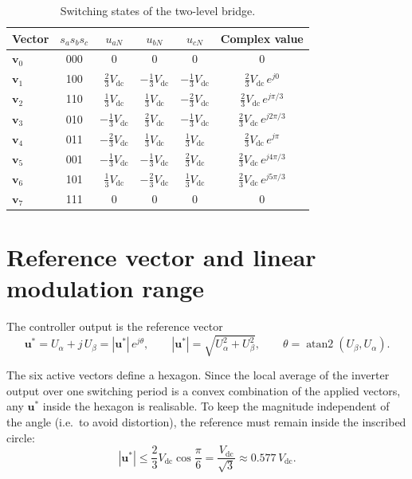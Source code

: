 \documentclass[11pt,a4paper]{article}
\newcommand{\vdc}{V_{\mathrm{dc}}}
\newcommand{\ualpha}{U_{\alpha}}
\newcommand{\ubeta}{U_{\beta}}
\newcommand{\vs}{\bm{u}^{*}}
\begin{document}
\begin{table}[h]
\centering
\begin{tabular}{lccccc}
\toprule
Vector & $s_a s_b s_c$ & $u_{aN}$ & $u_{bN}$ & $u_{cN}$ & Complex value \\
\midrule
$\bm{v}_0$ & 000 & $0$ & $0$ & $0$ & $0$ \\
$\bm{v}_1$ & 100 & $ \tfrac{2}{3}\vdc$ & $-\tfrac{1}{3}\vdc$ & $-\tfrac{1}{3}\vdc$ & $\tfrac{2}{3}\vdc\,e^{j0}$ \\
$\bm{v}_2$ & 110 & $ \tfrac{1}{3}\vdc$ & $ \tfrac{1}{3}\vdc$ & $-\tfrac{2}{3}\vdc$ & $\tfrac{2}{3}\vdc\,e^{j\pi/3}$ \\
$\bm{v}_3$ & 010 & $-\tfrac{1}{3}\vdc$ & $ \tfrac{2}{3}\vdc$ & $-\tfrac{1}{3}\vdc$ & $\tfrac{2}{3}\vdc\,e^{j2\pi/3}$ \\
$\bm{v}_4$ & 011 & $-\tfrac{2}{3}\vdc$ & $ \tfrac{1}{3}\vdc$ & $ \tfrac{1}{3}\vdc$ & $\tfrac{2}{3}\vdc\,e^{j\pi}$ \\
$\bm{v}_5$ & 001 & $-\tfrac{1}{3}\vdc$ & $-\tfrac{1}{3}\vdc$ & $ \tfrac{2}{3}\vdc$ & $\tfrac{2}{3}\vdc\,e^{j4\pi/3}$ \\
$\bm{v}_6$ & 101 & $ \tfrac{1}{3}\vdc$ & $-\tfrac{2}{3}\vdc$ & $ \tfrac{1}{3}\vdc$ & $\tfrac{2}{3}\vdc\,e^{j5\pi/3}$ \\
$\bm{v}_7$ & 111 & $0$ & $0$ & $0$ & $0$ \\
\bottomrule
\end{tabular}
\caption{Switching states of the two-level bridge.}
\end{table}

\section{Reference vector and linear modulation range}

The controller output is the reference vector
\begin{equation}
\vs = \ualpha + j\,\ubeta = |\vs|\,e^{j\theta}, \qquad
|\vs| = \sqrt{\ualpha^2 + \ubeta^2}, \qquad
\theta = \operatorname{atan2}(\ubeta,\ualpha).
\end{equation}

The six active vectors define a hexagon. Since the local average of the inverter
output over one switching period is a convex combination of the applied vectors, any
$\vs$ inside the hexagon is realisable. To keep the magnitude independent of the
angle (i.e.\ to avoid distortion), the reference must remain inside the inscribed
circle:
\begin{equation}
|\vs| \le \frac{2}{3}\vdc \cos\frac{\pi}{6} = \frac{\vdc}{\sqrt{3}} \approx 0.577\,\vdc .
\label{eq:limit}
\end{equation}
\end{document}
